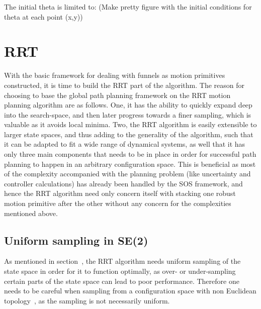 The initial theta is limited to: (Make pretty figure with the initial conditions
for theta at each point (x,y))

\section{RRT}

With the basic framework for dealing with funnels as motion primitives
constructed, it is time to build the \ac{RRT} part of the \rrtfunnel{}
algorithm. The reason for choosing to base the global path planning framework on
the \ac{RRT} motion planning algorithm are as follows. One, it has the ability
to quickly expand deep into the search-space, and then later progress towards a
finer sampling, which is valuable as it avoids local minima. Two, the \ac{RRT}
algorithm is easily extensible to larger state spaces, and thus adding to the
generality of the \rrtfunnel{} algorithm, such that it can be adapted to fit a
wide range of dynamical systems, as well that it has only three main components
that needs to be in place in order for successful path planning to happen in an
arbitrary configuration space. This is beneficial as most of the complexity
accompanied with the planning problem (like uncertainty and controller
calculations) has already been handled by the \ac{SOS} framework, and hence the
\ac{RRT} algorithm need only concern itself with stacking one robust motion
primitive after the other without any concern for the complexities mentioned
above.

\subsection{Uniform sampling in SE(2)}

As mentioned in section~, the \ac{RRT}
algorithm needs uniform sampling of the state space in order for it to function
optimally, as over- or under-sampling certain parts of the state space can lead
to poor performance. Therefore one needs to be careful when sampling from a
configuration space with non Euclidean
topology~\cite{kuffnerEffectiveSamplingDistance2004}, as the sampling is not
necessarily uniform.

